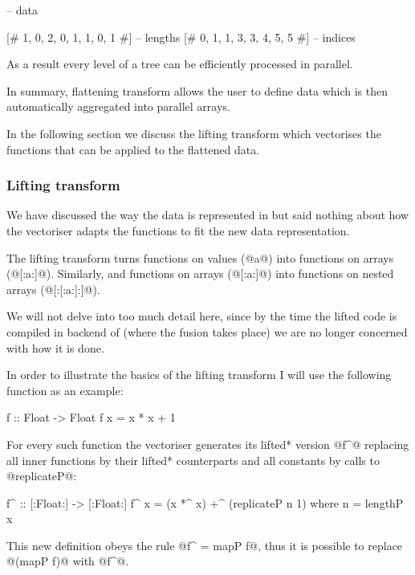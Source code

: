 \documentclass[preamble.tex]{subfiles}
\begin{document}
\begin{hscode}
[# 5, 4, 2, 3, 17, 11 #]       -- data

[# 1, 0, 2, 0, 1, 1, 0, 1 #]   -- lengths
[# 0, 1, 1, 3, 3, 4, 5, 5 #]   -- indices
\end{hscode}

As a result every level of a tree can be efficiently processed in parallel.

In summary, flattening transform allows the user to define data which is then automatically aggregated into parallel arrays.

In the following section we discuss the lifting transform which vectorises the functions that can be applied to the flattened data.


\subsubsection{Lifting transform}
\label{sec:Lifting}

We have discussed the way the data is represented in \DPH but said nothing about how the vectoriser adapts the functions to fit the new data representation.

The lifting transform turns functions on values (@a@) into functions on arrays (@[:a:]@). Similarly, and functions on arrays (@[:a:]@) into functions on nested arrays (@[:[:a:]:]@).

We will not delve into too much detail here, since by the time the lifted code is compiled in backend of \DPH (where the fusion takes place) we are no longer concerned with how it is done.

In order to illustrate the basics of the lifting transform I will use the following function as an example:

\begin{hscode}
f :: Float -> Float
f x = x * x + 1
\end{hscode}

For every such function the vectoriser generates its \*lifted* version @f^@ replacing all inner functions by their \*lifted* counterparts and all constants by calls to @replicateP@:

\begin{hscode}
f^ :: [:Float:] -> [:Float:]
f^ x = (x *^ x) +^ (replicateP n 1)
  where n = lengthP x
\end{hscode}

This new definition obeys the rule @f^ = mapP f@, thus it is possible to replace @(mapP f)@ with @f^@.
\end{document}
